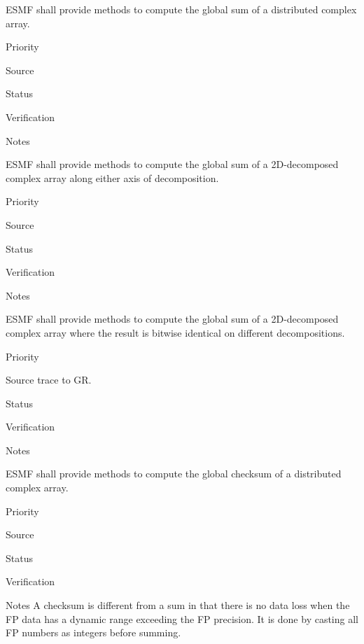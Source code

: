 
ESMF shall provide methods to compute the global sum of a distributed
complex array.

\begin{reqlist}
\item[Priority]
\item[Source]
\item[Status]
\item[Verification]
\item[Notes]
\end{reqlist}


ESMF shall provide methods to compute the global sum of a 2D-decomposed
complex array along either axis of decomposition.

\begin{reqlist}
\item[Priority]
\item[Source]
\item[Status]
\item[Verification]
\item[Notes]
\end{reqlist}


ESMF shall provide methods to compute the global sum of a
2D-decomposed complex array where the result is bitwise identical on
different decompositions.

\begin{reqlist}
\item[Priority]
\item[Source] trace to GR.
\item[Status]
\item[Verification]
\item[Notes]
\end{reqlist}


ESMF shall provide methods to compute the global checksum of a
distributed complex array. 

\begin{reqlist}
\item[Priority]
\item[Source]
\item[Status]
\item[Verification]
\item[Notes] A checksum is different from a sum in that there is no
  data loss when the FP data has a dynamic range exceeding the FP
  precision. It is done by casting all FP numbers as integers before
  summing.
\end{reqlist}

